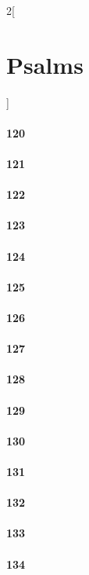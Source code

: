 \documentclass{book}
\begin{document}
\begin{multicols}{2}[\part{Psalms}]
\subsection*{120}
\subsection*{121}
\subsection*{122}
\subsection*{123}
\subsection*{124}
\subsection*{125}
\subsection*{126}
\subsection*{127}
\subsection*{128}
\subsection*{129}
\subsection*{130}
\subsection*{131}
\subsection*{132}
\subsection*{133}
\subsection*{134}

\end{multicols}
\end{document}
